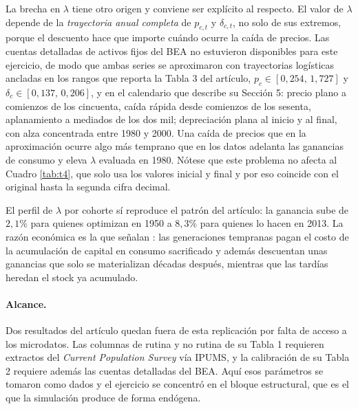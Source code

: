 \documentclass[12pt,letterpaper]{article}
\begin{document}
La brecha en $\lambda$ tiene otro origen y conviene ser explícito al respecto. El valor
de $\lambda$ depende de la \emph{trayectoria anual completa} de $p_{c,t}$ y
$\delta_{c,t}$, no solo de sus extremos, porque el descuento hace que importe cuándo
ocurre la caída de precios. Las cuentas detalladas de activos fijos del BEA no
estuvieron disponibles para este ejercicio, de modo que ambas series se aproximaron con
trayectorias logísticas ancladas en los rangos que reporta la Tabla 3 del artículo,
$p_{c}\in[0{,}254,\,1{,}727]$ y $\delta_{c}\in[0{,}137,\,0{,}206]$, y en el calendario
que describe su Sección 5: precio plano a comienzos de los cincuenta, caída rápida
desde comienzos de los sesenta, aplanamiento a mediados de los dos mil; depreciación
plana al inicio y al final, con alza concentrada entre 1980 y 2000. Una caída de
precios que en la aproximación ocurre algo más temprano que en los datos adelanta las
ganancias de consumo y eleva $\lambda$ evaluada en 1980. Nótese que este problema no
afecta al Cuadro \ref{tab:t4}, que solo usa los valores inicial y final y por eso
coincide con el original hasta la segunda cifra decimal.

El perfil de $\lambda$ por cohorte sí reproduce el patrón del artículo: la ganancia
sube de $2{,}1\%$ para quienes optimizan en 1950 a $8{,}3\%$ para quienes lo hacen en
2013. La razón económica es la que señalan \citet{eden2018}: las generaciones tempranas
pagan el costo de la acumulación de capital en consumo sacrificado y además descuentan
unas ganancias que solo se materializan décadas después, mientras que las tardías
heredan el stock ya acumulado.

\paragraph{Alcance.}
Dos resultados del artículo quedan fuera de esta replicación por falta de acceso a los
microdatos. Las columnas de rutina y no rutina de su Tabla 1 requieren extractos del
\emph{Current Population Survey} vía IPUMS, y la calibración de su Tabla 2 requiere
además las cuentas detalladas del BEA. Aquí esos parámetros se tomaron como dados y el
ejercicio se concentró en el bloque estructural, que es el que la simulación produce de
forma endógena.
\end{document}
